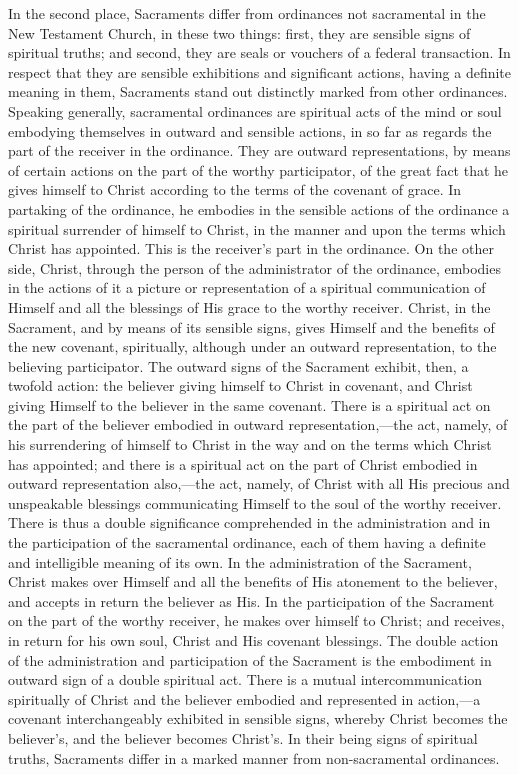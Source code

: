 \documentclass[
]{book}
\begin{document}
In the second place, Sacraments differ from ordinances not sacramental in the New Testament Church, in these two things: first, they are sensible signs of spiritual truths; and second, they are seals or vouchers of a federal transaction. In respect that they are sensible exhibitions and significant actions, having a definite meaning in them, Sacraments stand out distinctly marked from other ordinances. Speaking generally, sacramental ordinances are spiritual acts of the mind or soul embodying themselves in outward and sensible actions, in so far as regards the part of the receiver in the ordinance. They are outward representations, by means of certain actions on the part of the worthy participator, of the great fact that he gives himself to Christ according to the terms of the covenant of grace. In partaking of the ordinance, he embodies in the sensible actions of the ordinance a spiritual surrender of himself to Christ, in the manner and upon the terms which Christ has appointed. This is the receiver's part in the ordinance. On the other side, Christ, through the person of the administrator of the ordinance, embodies in the actions of it a picture or representation of a spiritual communication of Himself and all the blessings of His grace to the worthy receiver. Christ, in the Sacrament, and by means of its sensible signs, gives Himself and the benefits of the new covenant, spiritually, although under an outward representation, to the believing participator. The outward signs of the Sacrament exhibit, then, a twofold action: the believer giving himself to Christ in covenant, and Christ giving Himself to the believer in the same covenant. There is a spiritual act on the part of the believer embodied in outward representation,---the act, namely, of his surrendering of himself to Christ in the way and on the terms which Christ has appointed; and there is a spiritual act on the part of Christ embodied in outward representation also,---the act, namely, of Christ with all His precious and unspeakable blessings communicating Himself to the soul of the worthy receiver. There is thus a double significance comprehended in the administration and in the participation of the sacramental ordinance, each of them having a definite and intelligible meaning of its own. In the administration of the Sacrament, Christ makes over Himself and all the benefits of His atonement to the believer, and accepts in return the believer as His. In the participation of the Sacrament on the part of the worthy receiver, he makes over himself to Christ; and receives, in return for his own soul, Christ and His covenant blessings. The double action of the administration and participation of the Sacrament is the embodiment in outward sign of a double spiritual act. There is a mutual intercommunication spiritually of Christ and the believer embodied and represented in action,---a covenant interchangeably exhibited in sensible signs, whereby Christ becomes the believer's, and the believer becomes Christ's. In their being signs of spiritual truths, Sacraments differ in a marked manner from non-sacramental ordinances.
\end{document}
